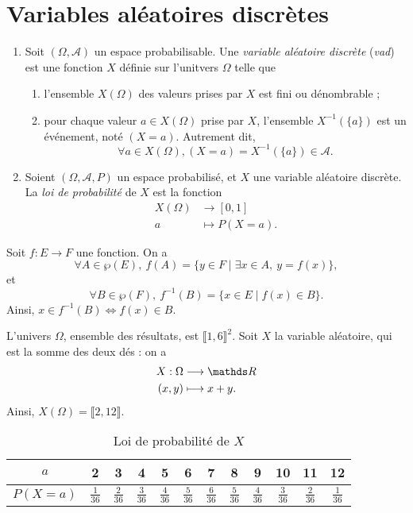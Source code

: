 \section{Variables aléatoires discrètes}

\begin{defn}
  \begin{enumerate}
    \item Soit $(\Omega,\mathcal{A})$ un espace probabilisable.
        Une \textit{variable aléatoire discrète} (\textit{vad}) est une fonction $X$ définie sur l'unitvers $\Omega$ telle que
        \begin{enumerate}
        \item l'ensemble $X(\Omega)$ des valeurs prises par $X$ est fini ou dénombrable ;
        \item pour chaque valeur $a \in X(\Omega)$ prise par $X$, l'ensemble $X^{-1}(\{a\})$ est un événement, noté $(X = a)$. Autrement dit, \[\forall a \in X(\Omega), (X=a) = X^{-1}(\{a\}) \in \mathcal{A}. \]
        \end{enumerate}
    \item Soient $(\Omega, \mathcal{A}, P)$ un espace probabilisé, et $X$ une variable aléatoire discrète. La \textit{loi de probabilité} de $X$ est la fonction
        \begin{align*}
          X(\Omega) &\longrightarrow [0,1]\\
          a &\longmapsto P(X = a).
        \end{align*}
  \end{enumerate}
\end{defn}

\begin{rap}
  Soit $f: E \to F$ une fonction. On a \[
    \forall A \in \wp(E),\: f(A) = \{ y \in F \mid \exists x \in A,\: y = f(x)\},
  \] et \[
    \forall B \in \wp(F),\: f^{-1}(B) = \{ x \in E \mid f(x) \in B \}.
  \] Ainsi, $x \in f^{-1}(B) \iff f(x) \in B$.
\end{rap}


\begin{exo}
  L'univers $\Omega$, ensemble des résultats, est $\llbracket 1,6 \rrbracket^{2}$.
  Soit $X$ la variable aléatoire, qui est la somme des deux dés : on a
  \begin{align*}
    X: \Omega &\longrightarrow \R\\
    (x,y) &\longmapsto x + y.
  \end{align*}
  Ainsi, $X(\Omega) = \llbracket 2, 12 \rrbracket$.
  \begin{table}[H]
    \centering
    \begin{tabular}{|c|ccccccccccc|}
      \hline
      $a$ & 2 & 3 & 4 & 5 & 6 & 7 & 8 & 9 & 10 & 11 & 12\\ \hline
      $P(X = a)$ & $\frac{1}{36}$ & $\frac{2}{36}$ & $\frac{3}{36}$ & $\frac{4}{36}$ & $\frac{5}{36}$ & $\frac{6}{36}$ &
      $\frac{5}{36}$ & $\frac{4}{36}$ & $\frac{3}{36}$ & $\frac{2}{36}$ & $\frac{1}{36}$ \\ \hline
    \end{tabular}
    \caption{Loi de probabilité de $X$}
  \end{table}
\end{exo}

